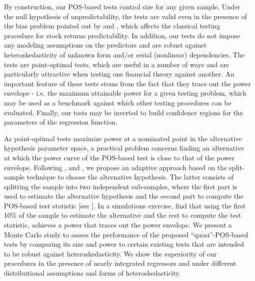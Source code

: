 \documentclass[harvard,11pt]{article}
\begin{document}
By construction, our POS-based tests control size for any given sample. Under the null hypothesis of unpredictability, the
tests are valid even in the presence of the bias problem pointed out by
\citet{mankiw1986we} and \citet{stambaugh1985bias,stambaugh1999predictive}, which affects the
classical testing procedure for stock returns predictability. In addition,
our tests do not impose any modeling assumptions on the predictors and are robust against heteroskedasticity of unknown form and/or serial (nonlinear) dependencies. The tests are point-optimal tests, which are
useful in a number of ways and are particularly attractive when testing
one financial theory against another. An important feature of these tests
stems from the fact that they trace out the power envelope - i.e. the maximum
attainable power for a given testing problem, which may be used as a
benchmark against which other testing procedures can be evaluated. Finally, our
tests may be inverted to build confidence regions for the parameters
of the regression function.

As point-optimal tests maximize power at a nominated point in the alternative hypothesis parameter space, a practical problem concerns finding an alternative at which the power curve of the POS-based test is close to that of the power envelope. Following \citet{dufour1998union}, \citet{dufour2001finite} and \citet{dufour2010exact}, we propose an adaptive approach based on the split-sample technique to choose the alternative hypothesis. The latter consists of splitting the sample into two independent sub-samples, where the first part is used to estimate the alternative hypothesis and the second part to compute the POS-based test statistic [see \citet{2008finite}]. In a simulations exercise, \citet{dufour2010exact} find that using the first 10\% of the sample to estimate the alternative and the rest to compute the test statistic, achieves a power that traces out the power envelope. We present a Monte Carlo study to assess the performance of the proposed \textquotedblleft quasi\textquotedblright-POS-based tests by comparing its size and power to certain existing tests that are intended to be robust against heteroskedasticity. We show the superiority of our procedures in the presence of nearly integrated regressors and under different distributional assumptions and forms of heteroskedasticity. 
\end{document}
